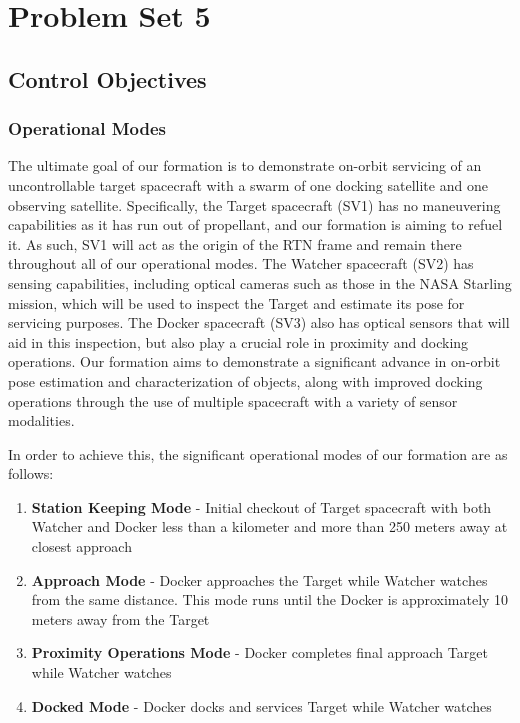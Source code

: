 \section{Problem Set 5}
\subsection{Control Objectives}
\subsubsection{Operational Modes}
The ultimate goal of our formation is to demonstrate on-orbit servicing of an uncontrollable target spacecraft with a swarm of one docking satellite and one observing satellite. Specifically, the Target spacecraft (SV1) has no maneuvering capabilities as it has run out of propellant, and our formation is aiming to refuel it. As such, SV1 will act as the origin of the RTN frame and remain there throughout all of our operational modes. The Watcher spacecraft (SV2) has sensing capabilities, including optical cameras such as those in the NASA Starling mission, which will be used to inspect the Target and estimate its pose for servicing purposes. The Docker spacecraft (SV3) also has optical sensors that will aid in this inspection, but also play a crucial role in proximity and docking operations. Our formation aims to demonstrate a significant advance in on-orbit pose estimation and characterization of objects, along with improved docking operations through the use of multiple spacecraft with a variety of sensor modalities. 

In order to achieve this, the significant operational modes of our formation are as follows: 

\begin{enumerate}
\item \textbf{Station Keeping Mode} - Initial checkout of Target spacecraft with both Watcher and Docker less than a kilometer and more than 250 meters away at closest approach
\item \textbf{Approach Mode} - Docker approaches the Target while Watcher watches from the same distance. This mode runs until the Docker is approximately 10 meters away from the Target
\item \textbf{Proximity Operations Mode} - Docker completes final approach Target while Watcher watches
\item \textbf{Docked Mode} - Docker docks and services Target while Watcher watches
\end{enumerate}


